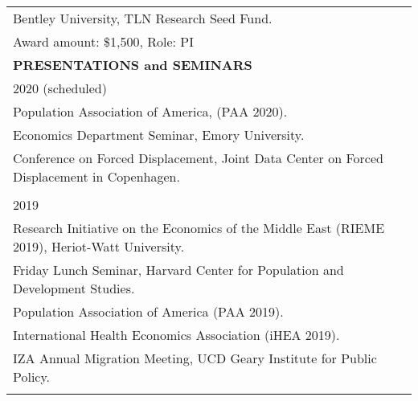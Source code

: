 \documentclass[12 pt]{article}
\begin{document}
\begin{longtable}{ccccc}
 \multicolumn{4}{l}{Bentley University, TLN Research Seed Fund.} \\
\multicolumn{4}{l}{Award amount: \$1,500, Role: PI}  \\



 

\multicolumn{5}{l}{\textbf{PRESENTATIONS and SEMINARS}}\\[2 pt]
 
\multicolumn{5}{l}{2020 (scheduled)}\\
\multicolumn{5}{l}{Population Association of America, (PAA 2020).} \\ 
\multicolumn{5}{l}{Economics Department Seminar, Emory University.} \\ 
\multicolumn{5}{l}{Conference on Forced Displacement, Joint Data Center on Forced Displacement in Copenhagen.}\\
\\
\multicolumn{5}{l}{2019} \\
\multicolumn{5}{l}{Research Initiative on the Economics of the Middle East (RIEME 2019), Heriot-Watt University.} \\
\multicolumn{5}{l}{Friday Lunch Seminar, Harvard Center for Population and Development Studies.} \\
\multicolumn{5}{l}{Population Association of America (PAA 2019).} \\
\multicolumn{5}{l}{International Health Economics Association (iHEA 2019).} \\
\multicolumn{5}{l}{IZA Annual Migration Meeting, UCD Geary Institute for Public Policy.} \\

\\ 


\end{longtable}
\end{document}
